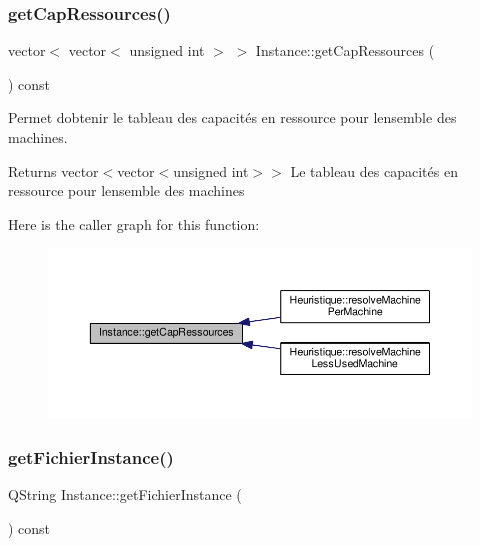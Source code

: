 \subsubsection{\texorpdfstring{get\+Cap\+Ressources()}{getCapRessources()}}
{\footnotesize\ttfamily vector$<$ vector$<$ unsigned int $>$ $>$ Instance\+::get\+Cap\+Ressources (\begin{DoxyParamCaption}{ }\end{DoxyParamCaption}) const}



Permet d\textquotesingle{}obtenir le tableau des capacités en ressource pour l\textquotesingle{}ensemble des machines. 

\begin{DoxyReturn}{Returns}
vector$<$vector$<$unsigned int$>$$>$ Le tableau des capacités en ressource pour l\textquotesingle{}ensemble des machines 
\end{DoxyReturn}
Here is the caller graph for this function\+:\nopagebreak
\begin{figure}[H]
\begin{center}
\leavevmode
\includegraphics[width=350pt]{classInstance_a5dac330671540cf94e87b7586cd3102e_icgraph}
\end{center}
\end{figure}
\mbox{\label{classInstance_a783365375cdab53149f87208374331a7}} 
\subsubsection{\texorpdfstring{get\+Fichier\+Instance()}{getFichierInstance()}}
{\footnotesize\ttfamily Q\+String Instance\+::get\+Fichier\+Instance (\begin{DoxyParamCaption}{ }\end{DoxyParamCaption}) const}




